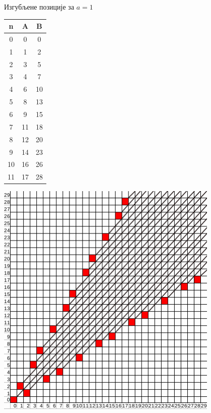 \documentclass[10pt]{beamer}
\theoremstyle{remark}
\theoremstyle{definition}
\begin{document}
	\begin{frame}{Изгубљене позиције за $ a = 1 $}
		\begin{center}
			\begin{minipage}[t]{.20\linewidth}
				\begin{table}[h!]
					\begin{center}
						\begin{tabular}{  c | c | c }
							{\textbf{n}} &  {\textbf{A}} &  {\textbf{B}} \\
							\hline
							0 & 0 & 0 \\
							1 & 1 & 2 \\
							2 & 3 & 5 \\
							3 & 4 & 7 \\
							4 & 6 & 10 \\
							5 & 8 & 13 \\
							6 & 9 & 15 \\
							7 & 11 & 18 \\
							8 & 12 & 20 \\
							9 & 14 & 23 \\
							10 & 16 & 26\\
							11 & 17 & 28\\ 
						\end{tabular}
					\end{center}
				\end{table}
			\end{minipage}%
			\begin{minipage}[t]{.80\linewidth}
				\vspace{0pt}
				\centering
				\includegraphics[width=0.8\textwidth]{../src/statistics/picture/p_positions_a=1.png}
			\end{minipage}
		\end{center}
	\end{frame}
	
\end{document}

